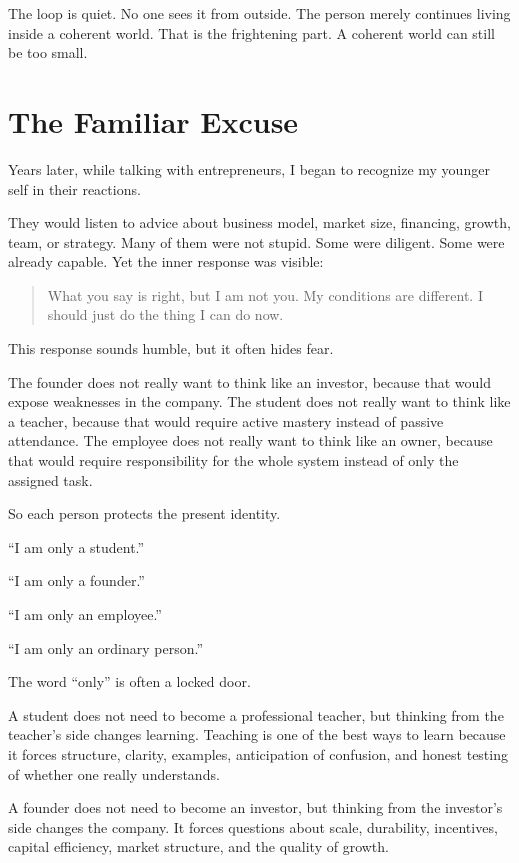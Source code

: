 The loop is quiet. No one sees it from outside. The person merely continues living inside a coherent world. That is the frightening part. A coherent world can still be too small.

\section*{The Familiar Excuse}

Years later, while talking with entrepreneurs, I began to recognize my younger self in their reactions.

They would listen to advice about business model, market size, financing, growth, team, or strategy. Many of them were not stupid. Some were diligent. Some were already capable. Yet the inner response was visible:

\begin{quote}
What you say is right, but I am not you. My conditions are different. I should just do the thing I can do now.
\end{quote}

This response sounds humble, but it often hides fear.

The founder does not really want to think like an investor, because that would expose weaknesses in the company. The student does not really want to think like a teacher, because that would require active mastery instead of passive attendance. The employee does not really want to think like an owner, because that would require responsibility for the whole system instead of only the assigned task.

So each person protects the present identity.

``I am only a student.''

``I am only a founder.''

``I am only an employee.''

``I am only an ordinary person.''

The word ``only'' is often a locked door.

A student does not need to become a professional teacher, but thinking from the teacher's side changes learning. Teaching is one of the best ways to learn because it forces structure, clarity, examples, anticipation of confusion, and honest testing of whether one really understands.

A founder does not need to become an investor, but thinking from the investor's side changes the company. It forces questions about scale, durability, incentives, capital efficiency, market structure, and the quality of growth.

